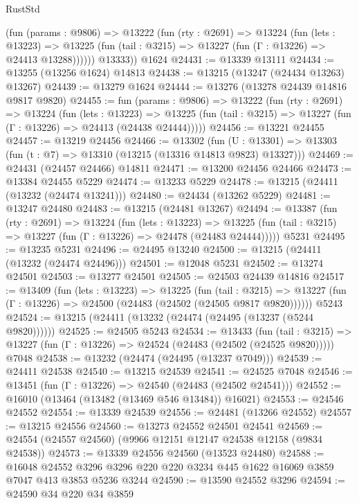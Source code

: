 \begin{lexlean}{RustStd}
\begin{coremodule}
          (fun (params : @9806) =>
          @13222
            (fun (rty : @2691) =>
            @13224
              (fun (lets : @13223) =>
              @13225 (fun (tail : @3215) => @13227 (fun (Γ : @13226) => @24413 @13288))))))
        @13333))
    @1624
@24431 := @13339 @13111
@24434 := @13255 (@13256 @1624) @14813
@24438 := @13215 (@13247 (@24434 @13263) @13267)
@24439 := @13279 @1624
@24444 := @13276 (@13278 @24439 @14816 @9817 @9820)
@24455 := fun (params : @9806) =>
  @13222
    (fun (rty : @2691) =>
    @13224
      (fun (lets : @13223) =>
      @13225 (fun (tail : @3215) => @13227 (fun (Γ : @13226) => @24413 (@24438 @24444)))))
@24456 := @13221 @24455
@24457 := @13219 @24456
@24466 := @13302
    (fun (U : @13301) => @13303 (fun (t : @7) => @13310 (@13215 (@13316 @14813 @9823) @13327)))
@24469 := @24431 (@24457 @24466) @14811
@24471 := @13200 @24456 @24466
@24473 := @13384 @24455 @5229
@24474 := @13233 @5229
@24478 := @13215 (@24411 (@13232 (@24474 @13241)))
@24480 := @24434 (@13262 @5229)
@24481 := @13247 @24480
@24483 := @13215 (@24481 @13267)
@24494 := @13387
    (fun (rty : @2691) =>
    @13224
      (fun (lets : @13223) =>
      @13225 (fun (tail : @3215) => @13227 (fun (Γ : @13226) => @24478 (@24483 @24444)))))
    @5231
@24495 := @13235 @5231
@24496 := @24495 @13240
@24500 := @13215 (@24411 (@13232 (@24474 @24496)))
@24501 := @12048 @5231
@24502 := @13274 @24501
@24503 := @13277 @24501
@24505 := @24503 @24439 @14816
@24517 := @13409
    (fun (lets : @13223) =>
    @13225
      (fun (tail : @3215) =>
      @13227 (fun (Γ : @13226) => @24500 (@24483 (@24502 (@24505 @9817 @9820))))))
    @5243
@24524 := @13215 (@24411 (@13232 (@24474 (@24495 (@13237 (@5244 @9820))))))
@24525 := @24505 @5243
@24534 := @13433
    (fun (tail : @3215) => @13227 (fun (Γ : @13226) => @24524 (@24483 (@24502 (@24525 @9820)))))
    @7048
@24538 := @13232 (@24474 (@24495 (@13237 @7049)))
@24539 := @24411 @24538
@24540 := @13215 @24539
@24541 := @24525 @7048
@24546 := @13451 (fun (Γ : @13226) => @24540 (@24483 (@24502 @24541)))
@24552 := @16010 (@13464 (@13482 (@13469 @546 @13484)) @16021)
@24553 := @24546 @24552
@24554 := @13339 @24539
@24556 := @24481 (@13266 @24552)
@24557 := @13215 @24556
@24560 := @13273 @24552 @24501 @24541
@24569 := @24554 (@24557 @24560) (@9966 @12151 @12147 @24538 @12158 (@9834 @24538))
@24573 := @13339 @24556 @24560 (@13523 @24480)
@24588 := @16048
    @24552
    @3296
    @3296
    @220
    @220
    @3234
    @445
    @1622
    @16069
    @3859
    @7047
    @413
    @3853
    @5236
    @3244
@24590 := @13590 @24552 @3296
@24594 := @24590 @34 @220 @34 @3859

\end{coremodule}
\end{lexlean}
